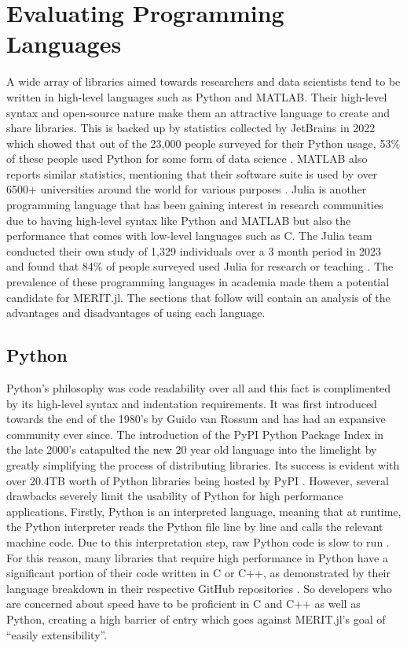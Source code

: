 \setcounter{chapter}{2}
\setcounter{section}{0}
\setcounter{subsection}{0}
\chapter*{Evaluating Programming Languages}
A wide array of libraries aimed towards researchers and data scientists tend to be written in high-level languages such
as Python and MATLAB. Their high-level syntax and open-source nature make them an attractive language to create and
share libraries. This is backed up by statistics collected by JetBrains in 2022 which showed that out of the 23,000
people surveyed for their Python usage, 53\% of these people used Python for some form of data science
\cite{PythonDevelopersSurvey}. MATLAB also reports similar statistics, mentioning that their software suite is used by
over 6500+ universities around the world for various purposes \cite{MATLABAcademia}. Julia is another programming
language that has been gaining interest in research communities due to having high-level syntax like Python and MATLAB
but also the performance that comes with low-level languages such as C. The Julia team conducted their own study of
1,329 individuals over a 3 month period in 2023 and found that 84\% of people surveyed used Julia for research or
teaching \cite{clasterJuliaUserDeveloper}. The prevalence of these programming languages in academia made them a
potential candidate for MERIT.jl. The sections that follow will contain an analysis of the advantages and
disadvantages of using each language.

\section{Python}
 Python's philosophy was code readability over all and this fact is complimented by its high-level syntax and
indentation requirements. It was first introduced towards the end of the 1980's by Guido van Rossum and has had an
expansive community ever since. The introduction of the PyPI Python Package Index in the late 2000's catapulted the new
20 year old language into the limelight by greatly simplifying the process of distributing libraries. Its success is
evident with over 20.4TB worth of Python libraries being hosted by PyPI \cite{indexPyPIStatistics}. However, several
drawbacks severely limit the usability of Python for high performance applications. Firstly, Python is an interpreted
language, meaning that at runtime, the Python interpreter reads the Python file line by line and calls the relevant
machine code. Due to this interpretation step, raw Python code is slow to run
\cite{baranyPythonInterpreterPerformance2014}. For this reason, many libraries that require high performance in Python
have a significant portion of their code written in C or C++, as demonstrated by their language breakdown in their respective GitHub repositories
\cite{Tensorflow, paszkePyTorch}. So developers who are concerned about speed have to be proficient in C and C++ as well
as Python, creating a high barrier of entry which goes against MERIT.jl's  goal of ``easily extensibility''.


